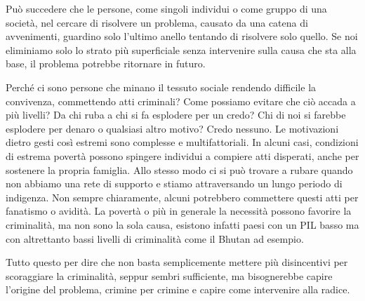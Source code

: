\documentclass[12pt]{book} %
\begin{document}
Può succedere che le persone, come singoli individui o come gruppo di una società, nel cercare
di risolvere un problema, causato da una catena di avvenimenti, guardino solo l'ultimo anello
tentando di risolvere solo quello. Se noi eliminiamo solo lo strato più superficiale senza intervenire sulla
causa che sta alla base, il problema potrebbe ritornare in futuro.

Perché ci sono persone che minano il tessuto sociale rendendo difficile la convivenza, commettendo atti criminali?
Come possiamo evitare che ciò accada a più livelli? Da chi ruba a chi si fa esplodere per un credo?
Chi di noi si farebbe esplodere per denaro o qualsiasi altro motivo? Credo nessuno.
Le motivazioni dietro gesti così estremi sono complesse e multifattoriali. In alcuni casi, condizioni di estrema povertà possono spingere individui a compiere atti disperati, anche per sostenere la propria famiglia.
Allo stesso modo ci si può trovare a rubare quando non abbiamo una rete di supporto e stiamo attraversando un lungo periodo di indigenza.
Non sempre chiaramente, alcuni potrebbero commettere questi atti per fanatismo o avidità.
La povertà o più in generale la necessità possono favorire la criminalità, ma non sono la sola causa, esistono infatti paesi con un PIL basso ma con altrettanto bassi livelli di criminalità come il Bhutan ad esempio.

Tutto questo per dire che non basta semplicemente mettere più disincentivi per scoraggiare la criminalità, seppur sembri sufficiente, ma bisognerebbe capire l'origine del problema, crimine per crimine e capire come intervenire alla radice.
\end{document}
